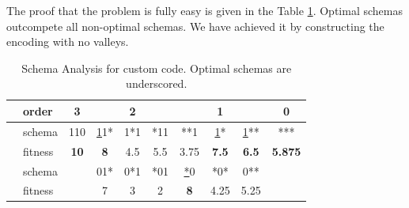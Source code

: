 \documentclass[12pt, a4paper]{article}
\begin{document}
        The proof that the problem is fully easy is given in the Table \ref{tab:sa_custom}.
        Optimal schemas outcompete all non-optimal schemas. We have achieved it by constructing
        the encoding with no valleys.
        \begin{table}[H]
        \centering
        \caption{Schema Analysis for custom code. Optimal schemas are underscored.}
        \label{tab:sa_custom}
            \begin{tabular}{|l|l|c|ccc|ccc|c|}
            \hline
            {\color[HTML]{000000} }                         & {\color[HTML]{000000} order}   & {\color[HTML]{000000} 3}           & \multicolumn{3}{c|}{{\color[HTML]{000000} 2}}                                                                 & \multicolumn{3}{c|}{{\color[HTML]{000000} 1}}                                                                 & {\color[HTML]{000000} 0}              \\ \hline
            {\color[HTML]{000000} }                         & {\color[HTML]{000000} schema}  & {\color[HTML]{000000} 110}         & {\color[HTML]{000000} {\ul 11*}}  & {\color[HTML]{000000} 1*1}          & {\color[HTML]{000000} *11}          & {\color[HTML]{000000} **1}        & {\color[HTML]{000000} {\ul *1*}}    & {\color[HTML]{000000} {\ul 1**}}    & {\color[HTML]{000000} ***}            \\
            {\color[HTML]{000000} }                         & {\color[HTML]{000000} fitness} & {\color[HTML]{000000} \textbf{10}} & {\color[HTML]{000000} \textbf{8}} & {\color[HTML]{000000} 4.5}          & {\color[HTML]{000000} 5.5}          & {\color[HTML]{000000} 3.75}       & {\color[HTML]{000000} \textbf{7.5}} & {\color[HTML]{000000} \textbf{6.5}} & {\color[HTML]{000000} \textbf{5.875}} \\ \cline{2-10}
            {\color[HTML]{000000} }                         & {\color[HTML]{000000} schema}  & {\color[HTML]{000000} }            & {\color[HTML]{000000} 01*}        & {\color[HTML]{000000} 0*1}          & {\color[HTML]{000000} *01}          & {\color[HTML]{000000} {\ul **0}}  & {\color[HTML]{000000} *0*}          & {\color[HTML]{000000} 0**}          & {\color[HTML]{000000} }               \\
            {\color[HTML]{000000} }                         & {\color[HTML]{000000} fitness} & {\color[HTML]{000000} }            & {\color[HTML]{000000} 7}          & {\color[HTML]{000000} 3}            & {\color[HTML]{000000} 2}            & {\color[HTML]{000000} \textbf{8}} & {\color[HTML]{000000} 4.25}         & {\color[HTML]{000000} 5.25}         & {\color[HTML]{000000} }               \\ \cline{2-10}

\end{tabular}
\end{table}
\end{document}
